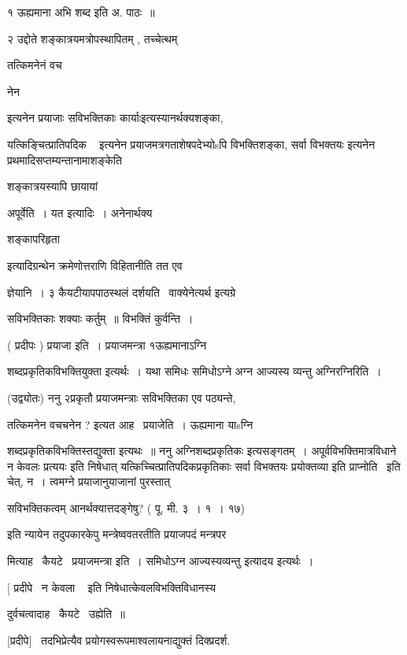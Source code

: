 \documentclass[11pt, openany]{book}
\begin{document}
१ {\qt ऊह्यमाना अभि शब्द} इति अ. पाठः~॥

२ उद्दोते शङ्कात्रयमत्रोपस्थापितम् , तच्चेत्थम् \textendash\ {\qt तत्किमनेनं वच \textendash\ 

नेन} इत्यनेन {\qt प्रयाजाः सविभक्तिकाः} कार्याःइत्यस्यानर्थक्यशङ्का,

{\qt यत्किङ्चित्प्रातिपदिक \textendash\ } इत्यनेन प्रयाजमत्रगताशेषपदेभ्योsपि
विभक्तिशङ्का, {\qt सर्वा विभक्तयः} इत्यनेन प्रथमादिसप्तम्यन्तानामाशङ्केति

शङ्कात्रयस्यापि छायायां {\qt अपूर्वेति~। यत इत्यादिः~। अनेनार्थक्य \textendash\ 

शङ्कापरिहृता} इत्यादिग्रन्थेन क्रमेणोत्तराणि विहितानीति तत एव

ज्ञेयानि~। ३ कैयटीयापपाठस्थलं दर्शयति \textendash\ वाक्येनेत्यर्थ इत्यग्रे 





 सविभक्तिकाः शक्याः कर्तुम्~॥ विभक्तिं कुर्वन्ति~। 

 ( प्रदीपः ) प्रयाजा इति~। प्रयाजमन्त्रा १ऊह्यमानाऽग्नि \textendash\ 

शब्दप्रकृतिकविभक्तियुक्ता इत्यर्थः~। यथा {\qt समिधः समिधोऽग्ने अग्न
आज्यस्य व्यन्तु} अग्निरग्निरिति~। 

 (उद्व्योतः) ननु २प्रकृतौ प्रयाजमन्त्राः सविभक्तिका एव पठ्यन्ते,

तत्किमनेन वचचनेन ? इत्यत आह \textendash\ प्रयाजेति~। ऊह्यमाना याsग्नि \textendash\ 

शब्दप्रकृतिकविभक्तिस्तद्युक्ता इत्यथः~॥ ननु {\qt अग्निशब्दप्रकृतिकः}
इत्यसङ्गतम्~। अपूर्वविभक्तिमात्रविधाने {\qt न केवलः} प्रत्ययः इति निषेधात्
यत्किच्चित्प्रातिपदिकप्रकृतिकाः सर्वा विभक्तयः प्रयोक्तव्या इति
प्राप्नोति \textendash\ इति चेत्, न~। {\qt त्वमग्ने} प्रयाजानुयाजानां पुरस्तात्



सविभक्तिकत्वम् {\qt आनर्थक्यात्तदङ्गेषु?} ( पू. मी. ३~। १~। १७)

इति न्यायेन तदुपकारकेपु मन्त्रेष्ववतरतीति प्रयाजपदं मन्त्रपर \textendash\ 

मित्याह \textendash\ कैयटे \textendash\ प्रयाजमन्त्रा इति~। {\qt समिधोऽग्न} आज्यस्यव्यन्तु इत्यादय
इत्यर्थः~। 

 [ प्रदीपे \textendash\ {\qt न केवला \textendash\ } इति निषेधात्केवलविभक्तिविधानस्य

दुर्वचत्वादाह \textendash\ कैयटे \textendash\ उह्येति~॥

 [प्रदीपे] \textendash\ तदभिप्रेत्यैव प्रयोगस्वरूपमाश्वलायनाद्युक्तं
दिक्प्रदर्श.
\end{document}
